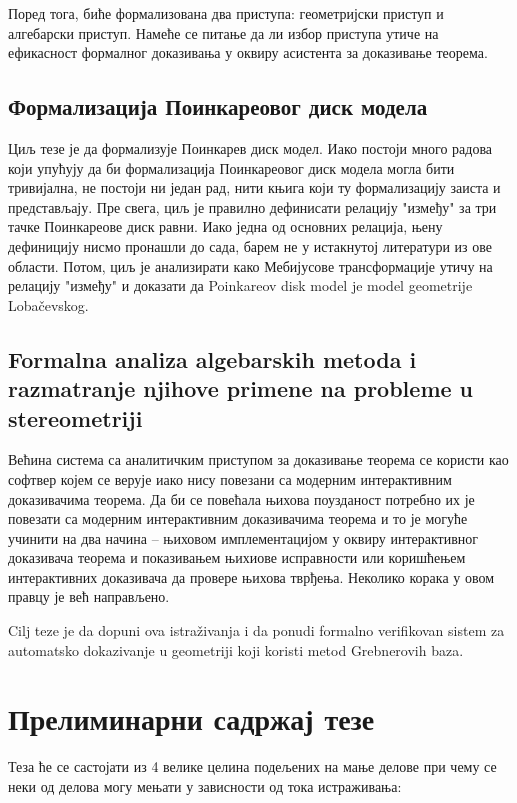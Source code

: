 \documentclass{article}
\begin{document}
Поред тога, биће формализована два приступа: геометријски приступ и
алгебарски приступ. Намеће се питање да ли избор приступа утиче на
ефикасност формалног доказивања у оквиру асистента за доказивање
теорема.

\subsection{Формализација Поинкареовог диск модела}

Циљ тезе је да формализује Поинкарев диск модел. Иако постоји много
радова који упућују да би формализација Поинкареовог диск модела могла
бити тривијална, не постоји ни један рад, нити књига који ту
формализацију заиста и представљају. Пре свега, циљ је правилно
дефинисати релацију "између" за три тачке Поинкареове диск равни. Иако
једна од основних релација, њену дефиницију нисмо пронашли до сада,
барем не у истакнутој литератури из ове области.  Потом, циљ је
анализирати како Мебијусове трансформације утичу на релацију "између"
и доказати да Poinkareov disk model je model geometrije Loba\v
cevskog.

\subsection{Formalna analiza algebarskih metoda i razmatranje njihove primene na probleme u stereometriji}

Већина система са аналитичким приступом за доказивање теорема се
користи као софтвер којем се верује иако нису повезани са модерним
интерактивним доказивачима теорема. Да би се повећала њихова
поузданост потребно их је повезати са модерним интерактивним
доказивачима теорема и то је могуће учинити на два начина -- њиховом
имплементацијом у оквиру интерактивног доказивача теорема и
показивањем њихиове исправности или коришћењем интерактивних
доказивача да провере њихова тврђења. Неколико корака у овом правцу је
већ направљено.

Cilj teze je da dopuni ova istra\v zivanja i da ponudi formalno
verifikovan sistem za automa{t}{s}ko dokazivanje u geometriji koji koristi
metod Grebnerovih baza.


\section{Прелиминарни садржај тезе}

Теза ће се састојати из 4 велике целина подељених на мање делове при
чему се неки од делова могу мењати у зависности од тока истраживања:
\end{document}
